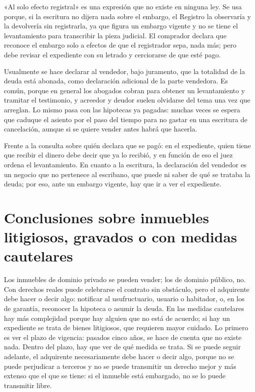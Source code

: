 \documentclass[12pt,oneside]{book}
\begin{document}
\begin{important}
«Al solo efecto registral» es una expresión que no existe en ninguna ley. Se usa porque, si la escritura no dijera nada sobre el embargo, el Registro la observaría y la devolvería sin registrarla, ya que figura un embargo vigente y no se tiene el levantamiento para transcribir la pieza judicial. El comprador declara que reconoce el embargo solo a efectos de que el registrador sepa, nada más; pero debe revisar el expediente con su letrado y cerciorarse de que esté pago.
\end{important}

Usualmente se hace declarar al vendedor, bajo juramento, que la totalidad de la deuda está abonada, como declaración adicional de la parte vendedora. Es común, porque en general los abogados cobran para obtener un levantamiento y tramitar el testimonio, y acreedor y deudor suelen olvidarse del tema una vez que arreglan. Lo mismo pasa con las hipotecas ya pagadas: muchas veces se espera que caduque el asiento por el paso del tiempo para no gastar en una escritura de cancelación, aunque si se quiere vender antes habrá que hacerla.

Frente a la consulta sobre quién declara que se pagó: en el expediente, quien tiene que recibir el dinero debe decir que ya lo recibió, y en función de eso el juez ordena el levantamiento. En cuanto a la escritura, la declaración del vendedor es un negocio que no pertenece al escribano, que puede ni saber de qué se trataba la deuda; por eso, ante un embargo vigente, hay que ir a ver el expediente.

\section{Conclusiones sobre inmuebles litigiosos, gravados o con medidas cautelares}

\begin{important}
Los inmuebles de dominio privado se pueden vender; los de dominio público, no. Con derechos reales puede celebrarse el contrato sin obstáculo, pero el adquirente debe hacer o decir algo: notificar al usufructuario, usuario o habitador, o, en los de garantía, reconocer la hipoteca o asumir la deuda. En las medidas cautelares hay más complejidad porque hay alguien que no está de acuerdo; si hay un expediente se trata de bienes litigiosos, que requieren mayor cuidado. Lo primero es ver el plazo de vigencia: pasados cinco años, se hace de cuenta que no existe nada. Dentro del plazo, hay que ver de qué medida se trata. Si se puede seguir adelante, el adquirente necesariamente debe hacer o decir algo, porque no se puede perjudicar a terceros y no se puede transmitir un derecho mejor y más extenso que el que se tiene: si el inmueble está embargado, no se lo puede transmitir libre.
\end{important}
\end{document}
